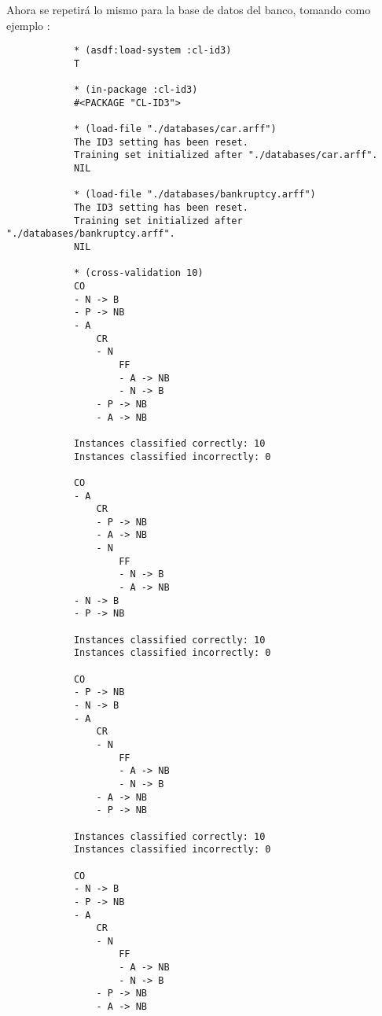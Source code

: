\begin{itemize}
\begin{solution}
        Ahora se repetirá lo mismo para la base de datos del banco, tomando como ejemplo :
        \begin{verbatim}
            * (asdf:load-system :cl-id3)
            T

            * (in-package :cl-id3)
            #<PACKAGE "CL-ID3">

            * (load-file "./databases/car.arff")
            The ID3 setting has been reset.
            Training set initialized after "./databases/car.arff".
            NIL

            * (load-file "./databases/bankruptcy.arff")
            The ID3 setting has been reset.
            Training set initialized after "./databases/bankruptcy.arff".
            NIL

            * (cross-validation 10)
            CO
            - N -> B
            - P -> NB
            - A
                CR
                - N
                    FF
                    - A -> NB
                    - N -> B
                - P -> NB
                - A -> NB

            Instances classified correctly: 10
            Instances classified incorrectly: 0

            CO
            - A
                CR
                - P -> NB
                - A -> NB
                - N
                    FF
                    - N -> B
                    - A -> NB
            - N -> B
            - P -> NB

            Instances classified correctly: 10
            Instances classified incorrectly: 0

            CO
            - P -> NB
            - N -> B
            - A
                CR
                - N
                    FF
                    - A -> NB
                    - N -> B
                - A -> NB
                - P -> NB

            Instances classified correctly: 10
            Instances classified incorrectly: 0

            CO
            - N -> B
            - P -> NB
            - A
                CR
                - N
                    FF
                    - A -> NB
                    - N -> B
                - P -> NB
                - A -> NB


\end{verbatim}
\end{solution}
\end{itemize}
